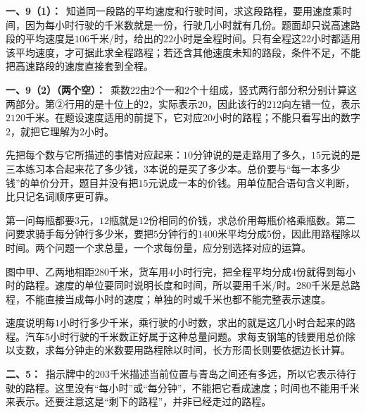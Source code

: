 \documentclass[multi=snippet,border=0pt]{standalone}
\newenvironment{snippet}[3]{\begin{minipage}{#1bp}\color{answerred}\fontsize{#2}{#3}\selectfont\raggedright}{\end{minipage}}
\begin{document}
\begin{snippet}{505}{11.5}{14}\textbf{一、9（1）：}\ 知道同一段路的平均速度和行驶时间，求这段路程，要用速度乘时间，因为每小时行驶的千米数就是一份，行驶几小时就有几份。题面却只说高速路段的平均速度是\(106\)千米/时，给出的\(22\)小时是全程时间。只有全程这\(22\)小时都适用该平均速度，才可据此求全程路程；若还含其他速度未知的路段，条件不足，不能把高速路段的速度直接套到全程。\end{snippet}
\begin{snippet}{505}{11.5}{14}\textbf{一、9（2）（两个空）：}\ 乘数\(22\)由\(2\)个一和\(2\)个十组成，竖式两行部分积分别计算这两部分。第②行用的是十位上的\(2\)，实际表示\(20\)，因此该行的\(212\)向左错一位，表示\(2120\)千米。在题设速度适用的前提下，它对应\(20\)小时的路程；不能只看写出的数字\(2\)，就把它理解为\(2\)小时。\end{snippet}
\begin{snippet}{505}{11.5}{14}先把每个数与它所描述的事情对应起来：\(10\)分钟说的是走路用了多久，\(15\)元说的是三本练习本合起来花了多少钱，\(3\)本说的是买了多少本。总价要与“每一本多少钱”的单价分开，题目并没有把\(15\)元说成一本的价钱。用单位配合语句含义判断，比只记名词顺序更可靠。\end{snippet}
\begin{snippet}{505}{11.5}{14}第一问每瓶都要\(3\)元，\(12\)瓶就是\(12\)份相同的价钱，求总价用每瓶价格乘瓶数。第二问要求骑手每分钟行多少米，要把\(5\)分钟行的\(1400\)米平均分成\(5\)份，因此用路程除以时间。两个问题一个求总量，一个求每份量，应分别选择对应的运算。\end{snippet}
\begin{snippet}{505}{11.5}{14}图中甲、乙两地相距\(280\)千米，货车用\(4\)小时行完，把全程平均分成\(4\)份就得到每小时的路程。速度的单位要同时说明长度和时间，所以要用千米/时。\(280\)千米是总路程，不能直接当成每小时的速度；单独的时或千米也都不能完整表示速度。\end{snippet}
\begin{snippet}{505}{11.5}{14}速度说明每\(1\)小时行多少千米，乘行驶的小时数，求出的就是这几小时合起来的路程。汽车\(5\)小时行驶的千米数正好属于这种总量问题。求每支钢笔的钱要用总价除以支数，求每分钟走的米数要用路程除以时间，长方形周长则要依据边长计算。\end{snippet}
\begin{snippet}{505}{11.5}{14}\textbf{二、5：}\ 指示牌中的\(203\)千米描述当前位置与青岛之间还有多远，所以它表示待行驶的路程。这里没有“每小时”或“每分钟”，不能把它看成速度；时间也不能用千米来表示。还要注意这是“剩下的路程”，并非已经走过的路程。\end{snippet}
\end{document}
